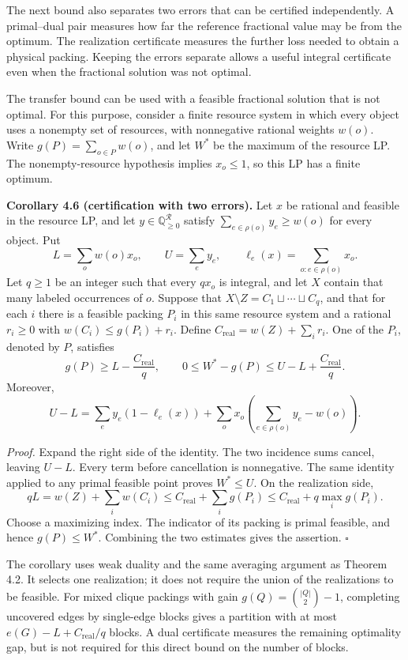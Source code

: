 \documentclass[english,11pt,a4paper]{article}
\newcounter{none}
\begin{document}
The next bound also separates two errors that can be certified
independently. A primal--dual pair measures how far the reference
fractional value may be from the optimum. The realization certificate
measures the further loss needed to obtain a physical packing. Keeping
the errors separate allows a useful integral certificate even when the
fractional solution was not optimal.

The transfer bound can be used with a feasible fractional solution that
is not optimal. For this purpose, consider a finite resource system in
which every object uses a nonempty set of resources, with nonnegative
rational weights \(w(o)\). Write \(g(P)=\sum_{o\in P}w(o)\), and let
\(W^*\) be the maximum of the resource LP. The nonempty-resource
hypothesis implies \(x_o\le1\), so this LP has a finite optimum.

\textbf{Corollary 4.6 (certification with two errors).} Let \(x\) be
rational and feasible in the resource LP, and let
\(y\in\mathbb Q_{\ge0}^{\mathcal R}\) satisfy
\(\sum_{e\in\rho(o)}y_e\ge w(o)\) for every object. Put \[
L=\sum_o w(o)x_o,\qquad U=\sum_e y_e,
\qquad \ell_e(x)=\sum_{o:e\in\rho(o)}x_o.
\] Let \(q\ge1\) be an integer such that every \(qx_o\) is integral, and
let \(X\) contain that many labeled occurrences of \(o\). Suppose that
\(X\setminus Z=C_1\sqcup\cdots\sqcup C_q\), and that for each \(i\)
there is a feasible packing \(P_i\) in this same resource system and a
rational \(r_i\ge0\) with \(w(C_i)\le g(P_i)+r_i\). Define
\(C_{\mathrm{real}}=w(Z)+\sum_i r_i\). One of the \(P_i\), denoted by
\(P\), satisfies \[
g(P)\ge L-\frac{C_{\mathrm{real}}}{q},
\qquad
0\le W^*-g(P)\le U-L+\frac{C_{\mathrm{real}}}{q}.
\] Moreover, \[
U-L=\sum_e y_e(1-\ell_e(x))
 +\sum_o x_o\left(\sum_{e\in\rho(o)}y_e-w(o)\right).
\]

\emph{Proof.} Expand the right side of the identity. The two incidence
sums cancel, leaving \(U-L\). Every term before cancellation is
nonnegative. The same identity applied to any primal feasible point
proves \(W^*\le U\). On the realization side, \[
qL=w(Z)+\sum_i w(C_i)
\le C_{\mathrm{real}}+\sum_i g(P_i)
\le C_{\mathrm{real}}+q\max_i g(P_i).
\] Choose a maximizing index. The indicator of its packing is primal
feasible, and hence \(g(P)\le W^*\). Combining the two estimates gives
the assertion. \(\square\)

The corollary uses weak duality and the same averaging argument as
Theorem 4.2. It selects one realization; it does not require the union
of the realizations to be feasible. For mixed clique packings with gain
\(g(Q)=\binom{|Q|}{2}-1\), completing uncovered edges by single-edge
blocks gives a partition with at most \(e(G)-L+C_{\mathrm{real}}/q\)
blocks. A dual certificate measures the remaining optimality gap, but is
not required for this direct bound on the number of blocks.
\end{document}
